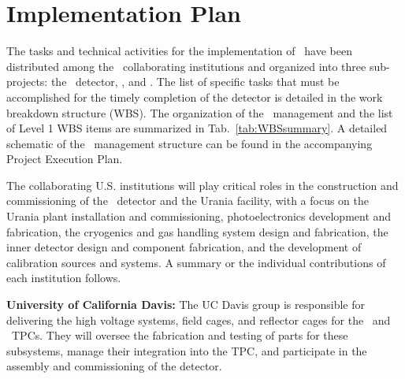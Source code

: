 \section{Implementation Plan}
\label{sec:implementation}



The tasks and technical activities for the implementation of \DSks\ have been distributed among the \GADMC\ collaborating institutions and organized into three sub-projects: the \DSks\ detector, \Urania, and \Aria. The list of specific tasks that must be accomplished for the timely completion of the detector is detailed in the work breakdown structure (WBS).  The organization of the \GADMC\ management and the list of Level 1 WBS items are summarized in Tab.~\ref{tab:WBSsummary}. A detailed schematic of the \GADMC\ management structure can be found in the accompanying Project Execution Plan.

The collaborating U.S. institutions will play critical roles in the construction and commissioning of the \DSks\ detector and the Urania facility, with a focus on the Urania plant installation and commissioning, photoelectronics development and fabrication, the cryogenics and gas handling system design and fabrication, the inner detector design and component fabrication, and the development of calibration sources and systems. A summary or the individual contributions of each institution follows.

{\bf University of California Davis:} The UC Davis group is responsible for delivering the high voltage systems, field cages, and reflector cages for the \DSps\ and \DSks\ TPCs. They will oversee the fabrication and testing of parts for these subsystems, manage their integration into the TPC, and participate in the assembly and commissioning of the detector.

